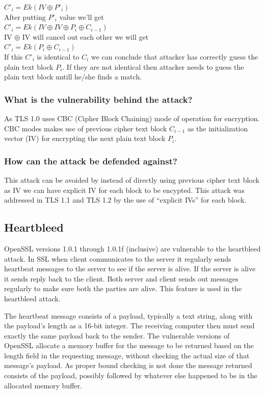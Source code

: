 \documentclass{article}
\begin{document}
\noindent $C'_i = Ek(IV \oplus P'_i)$ \\
After putting $P'_i$ value we'll get \\ 
$C'_i = Ek(IV \oplus IV \oplus P_i \oplus C_{i-1}) $\\ 
IV $\oplus$ IV will cancel out each other we will get\\
$C'_i = Ek(P_i \oplus C_{i-1})$ \\
If this $C'_i$ is identical to $C_i$ we can conclude that attacker has correctly guess the plain text block $P_i$. If they are not identical then attacker needs to guess the plain text block untill he/she finds a match.

\subsubsection{What is the vulnerability behind the attack?}
\indent \indent As TLS 1.0 uses CBC (Cipher Block Chaining) mode of operation for encryption. CBC modes makes use of previous cipher text block $C_{i-1}$ as the initialization vector (IV) for encrypting the next plain text block $P_i$.

\subsubsection{How can the attack be defended against?}
\indent \indent This attack can be avoided by instead of directly using previous cipher text block as IV we can have explicit IV for each block to be encypted. This attack was addressed in TLS 1.1 and TLS 1.2 by the use of “explicit IVs” for each block.

\subsection{Heartbleed}

\indent \indent OpenSSL versions 1.0.1 through 1.0.1f (inclusive) are vulnerable to the heartbleed attack.
In SSL when client communicates to the server it regularly sends heartbeat messages to the server to see if the server is alive. If the server is alive it sends reply back to the client. Both server and client sends out messages regularly to make sure both the parties are alive. This feature is used in the heartbleed attack.

The heartbeat message consists of a payload, typically a text string, along with the payload's length as a 16-bit integer. The receiving computer then must send exactly the same payload back to the sender. The vulnerable versions of OpenSSL allocate a memory buffer for the message to be returned based on the length field in the requesting message, without checking the actual size of that message's payload. As proper bound checking is not done the message returned consists of the payload, possibly followed by whatever else happened to be in the allocated memory buffer.
\end{document}
